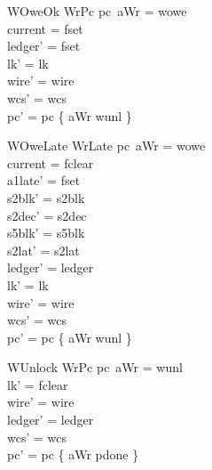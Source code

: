 \documentclass[a4paper,10pt,fleqn]{article}
\begin{document}
\begin{schema}{WOweOk}
  WrPc
\where
  pc~aWr = wowe \\
  current = fset \\
  ledger' = fset \\
  lk' = lk \\
  wire' = wire \\
  wcs' = wcs \\
  pc' = pc \oplus \{ aWr \mapsto wunl \}
\end{schema}

\begin{schema}{WOweLate}
  WrLate
\where
  pc~aWr = wowe \\
  current = fclear \\
  a1late' = fset \\
  s2blk' = s2blk \\
  s2dec' = s2dec \\
  s5blk' = s5blk \\
  s2lat' = s2lat \\
  ledger' = ledger \\
  lk' = lk \\
  wire' = wire \\
  wcs' = wcs \\
  pc' = pc \oplus \{ aWr \mapsto wunl \}
\end{schema}

\begin{schema}{WUnlock}
  WrPc
\where
  pc~aWr = wunl \\
  lk' = fclear \\
  wire' = wire \\
  ledger' = ledger \\
  wcs' = wcs \\
  pc' = pc \oplus \{ aWr \mapsto pdone \}
\end{schema}
\end{document}
